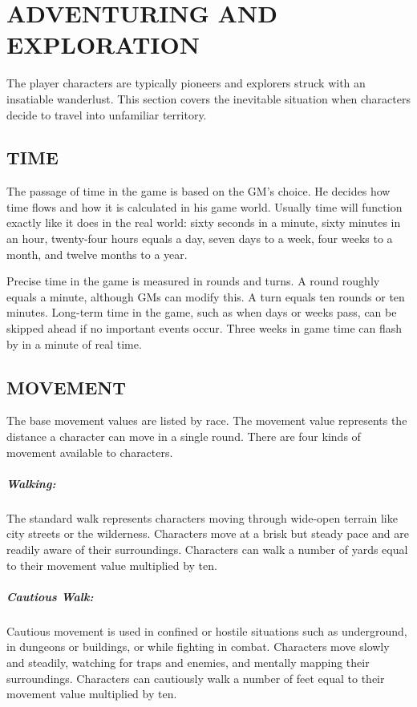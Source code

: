 \chapter{ADVENTURING AND EXPLORATION}

\begin{multicols}{2}

The player characters are typically pioneers and explorers struck with an insatiable wanderlust.  This section covers the inevitable situation when characters decide to travel into unfamiliar territory.

\section{TIME}

The passage of time in the game is based on the GM's choice.  He decides how time flows and how it is calculated in his game world.  Usually time will function exactly like it does in the real world: sixty seconds in a minute, sixty minutes in an hour, twenty-four hours equals a day, seven days to a week, four weeks to a month, and twelve months to a year.

Precise time in the game is measured in rounds and turns.  A round roughly equals a minute, although GMs can modify this.  A turn equals ten rounds or ten minutes.  Long-term time in the game, such as when days or weeks pass, can be skipped ahead if no important events occur.  Three weeks in game time can flash by in a minute of real time.

\section{MOVEMENT}

The base movement values are listed by race.  The movement value represents the distance a character can move in a single round.  There are four kinds of movement available to characters.

\paragraph{Walking:} The standard walk represents characters moving through wide-open terrain like city streets or the wilderness.  Characters move at a brisk but steady pace and are readily aware of their surroundings.  Characters can walk a number of yards equal to their movement value multiplied by ten.

\paragraph{Cautious Walk:} Cautious movement is used in confined or hostile situations such as underground, in dungeons or buildings, or while fighting in combat.  Characters move slowly and steadily, watching for traps and enemies, and mentally mapping their surroundings.  Characters can cautiously walk a number of feet equal to their movement value multiplied by ten.


\end{multicols}
